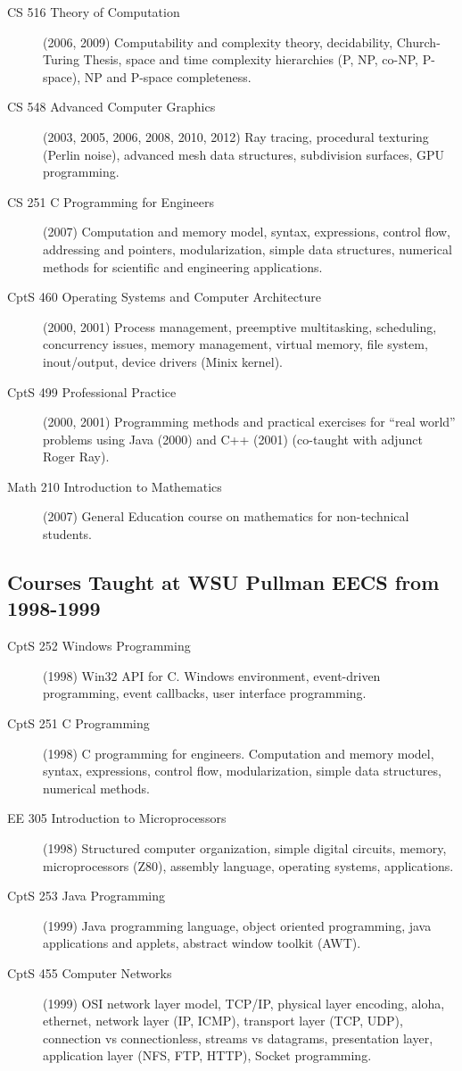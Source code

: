 \documentclass[10pt]{article}
\begin{document}
\begin{description}
  \item[CS 516 Theory of Computation] (2006, 2009) Computability and complexity theory, decidability, 
      Church-Turing Thesis, space and time complexity hierarchies (P, NP, co-NP, P-space), NP and P-space
      completeness.
  \item[CS 548 Advanced Computer Graphics] (2003, 2005, 2006, 2008, 2010, 2012) Ray tracing, procedural 
      texturing (Perlin noise), advanced mesh data structures, subdivision surfaces, GPU programming.
  \item[CS 251 C Programming for Engineers] (2007) Computation and memory model,
    syntax, expressions, control flow, addressing and pointers, modularization, simple data structures, 
    numerical methods for scientific and engineering applications.
  \item[CptS 460 Operating Systems and Computer Architecture] (2000, 2001) Process management, 
     preemptive multitasking, scheduling, concurrency issues, memory management, virtual memory, file system,
     inout/output, device drivers (Minix kernel).
  \item[CptS 499 Professional Practice] (2000, 2001) Programming methods and practical exercises
     for ``real world'' problems using
     Java (2000) and C++ (2001) (co-taught with adjunct Roger Ray).
  \item[Math 210 Introduction to Mathematics] (2007) General Education course on mathematics for non-technical
     students.
\end{description}

\subsection*{Courses Taught at WSU Pullman EECS from 1998-1999}

\begin{description}
  \item[CptS 252 Windows Programming] (1998) Win32 API for C. Windows environment, event-driven programming,
     event callbacks, user interface programming.
  \item[CptS 251 C Programming] (1998) C programming for engineers. Computation and memory model,
    syntax, expressions, control flow, modularization, simple data structures, numerical methods.
  \item[EE 305 Introduction to Microprocessors] (1998) Structured computer organization, simple digital
     circuits, memory, microprocessors (Z80), assembly language, operating systems, applications.
  \item[CptS 253 Java Programming] (1999) Java programming language, object oriented programming,
     java applications and applets, abstract window toolkit (AWT).
  \item[CptS 455 Computer Networks] (1999) OSI network layer model, TCP/IP, physical layer encoding, 
      aloha, ethernet, network layer (IP, ICMP), transport layer (TCP, UDP), connection vs connectionless,
      streams vs datagrams, presentation layer, application layer (NFS, FTP, HTTP), Socket programming.
\end{description}
\end{document}
